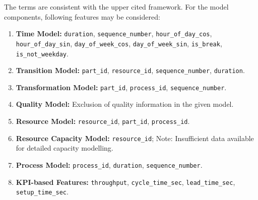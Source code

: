 The terms are consistent with the upper cited framework. For the model components, following features may be considered:

\begin{enumerate}
  \item \textbf{Time Model:} \texttt{duration}, \texttt{sequence\_number}, \texttt{hour\_of\_day\_cos}, \texttt{hour\_of\_day\_sin}, \texttt{day\_of\_week\_cos}, \texttt{day\_of\_week\_sin}, \texttt{is\_break}, \texttt{is\_not\_weekday}.

  \item \textbf{Transition Model:} \texttt{part\_id}, \texttt{resource\_id}, \texttt{sequence\_number}, \texttt{duration}.

  \item \textbf{Transformation Model:} \texttt{part\_id}, \texttt{process\_id}, \texttt{sequence\_number}.

  \item \textbf{Quality Model:} Exclusion of quality information in the given model.

  \item \textbf{Resource Model:} \texttt{resource\_id}, \texttt{part\_id}, \texttt{process\_id}.

  \item \textbf{Resource Capacity Model:} \texttt{resource\_id}; Note: Insufficient data available for detailed capacity modelling.

  \item \textbf{Process Model:} \texttt{process\_id}, \texttt{duration}, \texttt{sequence\_number}.

  \item \textbf{KPI-based Features:} \texttt{throughput}, \texttt{cycle\_time\_sec}, \texttt{lead\_time\_sec}, \texttt{setup\_time\_sec}.
\end{enumerate}


